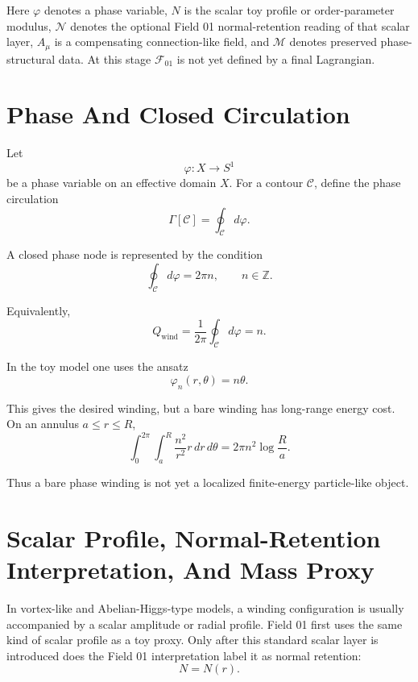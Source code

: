 \documentclass[11pt,a4paper]{article}
\newcommand{\field}{\mathcal{F}_{01}}
\newcommand{\phase}{\varphi}
\newcommand{\normal}{\mathcal{N}}
\newcommand{\memory}{\mathcal{M}}
\newcommand{\wind}{\mathrm{wind}}
\begin{document}
Here $\phase$ denotes a phase variable, $N$ is the scalar toy profile or order-parameter modulus, $\normal$ denotes the optional Field 01 normal-retention reading of that scalar layer, $A_\mu$ is a compensating connection-like field, and $\memory$ denotes preserved phase-structural data. At this stage $\field$ is not yet defined by a final Lagrangian.

\section{Phase And Closed Circulation}

Let
\begin{equation}
\phase:X\to S^1
\end{equation}
be a phase variable on an effective domain $X$. For a contour $\mathcal{C}$, define the phase circulation
\begin{equation}
\Gamma[\mathcal{C}]=\oint_{\mathcal{C}}d\phase.
\end{equation}

A closed phase node is represented by the condition
\begin{equation}
\oint_{\mathcal{C}}d\phase=2\pi n, \qquad n\in\mathbb{Z}.
\end{equation}

Equivalently,
\begin{equation}
Q_{\wind}=\frac{1}{2\pi}\oint_{\mathcal{C}}d\phase=n.
\end{equation}

In the toy model one uses the ansatz
\begin{equation}
\phase_n(r,\theta)=n\theta.
\end{equation}

This gives the desired winding, but a bare winding has long-range energy cost. On an annulus $a\le r\le R$,
\begin{equation}
\int_0^{2\pi}\int_a^R \frac{n^2}{r^2}r\,dr\,d\theta
=2\pi n^2\log\frac{R}{a}.
\end{equation}

Thus a bare phase winding is not yet a localized finite-energy particle-like object.

\section{Scalar Profile, Normal-Retention Interpretation, And Mass Proxy}

In vortex-like and Abelian-Higgs-type models, a winding configuration is usually accompanied by a scalar amplitude or radial profile. Field 01 first uses the same kind of scalar profile as a toy proxy. Only after this standard scalar layer is introduced does the Field 01 interpretation label it as normal retention:
\begin{equation}
N=N(r).
\end{equation}
\end{document}
